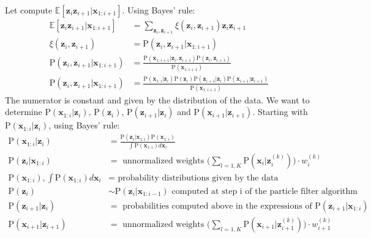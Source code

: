 \documentclass[12pt]{article}
\newcommand{\p}[1]{\mathrm{P}\left(#1 \right)}
\newcommand{\vect}[1]{\mathbf{#1}}
\begin{document}
Let compute $\mathbb{E}[\vect{z}_i \vect{z}_{i+1} | \vect{x}_{1:i+1} ]$.
Using Bayes' rule:
\begin{align*}
	\mathbb{E}[\vect{z}_i \vect{z}_{i+1} | \vect{x}_{1:i+1} ]	&=	\sum_{\vect{z}_i, \vect{z}_{i+1}} \xi(\vect{z}_i, \vect{z}_{i+1}) \vect{z}_i \vect{z}_{i+1} \\
	 \xi(\vect{z}_i, \vect{z}_{i+1})						&=	\p{\vect{z}_i, \vect{z}_{i+1} | \vect{x}_{1:i+1}} \\
	 \p{\vect{z}_i, \vect{z}_{i+1} | \vect{x}_{1:i+1}}			&= 	\frac{ \p{\vect{x}_{1:i+1} | \vect{z}_i,\vect{z}_{i+1}}  \p{\vect{z}_i, \vect{z}_{i+1}} } {\p{\vect{x}_{1:i+1}}} \\
	 \p{\vect{z}_i, \vect{z}_{i+1} | \vect{x}_{1:i+1}}			&= \frac{\p{\vect{x}_{1:i} | \vect{z}_i} \p{\vect{z}_i}  \p{\vect{z}_{i+1} | \vect{z}_i}  \p{\vect{x}_{i+1} | \vect{z}_{i+1} } } {\p{\vect{x}_{1:i+1}}}
\end{align*}
The numerator is constant and given by the distribution of the data. We want to determine $\p{\vect{x}_{1:i} | \vect{z}_i}$, $\p{\vect{z}_i}$, $\p{\vect{z}_{i+1} | \vect{z}_i}$ and $ \p{\vect{x}_{i+1} | \vect{z}_{i+1} }$.
Starting with $\p{\vect{x}_{1:i} | \vect{z}_i}$, using Bayes' rule:
\begin{align*}
		\p{\vect{x}_{1:i} | \vect{z}_i}					&=	\frac{ \p{\vect{z}_i | \vect{x}_{1:i}} \p{\vect{x}_{1:i}} }		{\int  \p{\vect{x}_{1:i}} d \vect{x}_i} \\
		\p{\vect{z}_i | \vect{x}_{1:i}}					&= \text{ unnormalized weights } \big( \sum_{l=1,K} \p{\vect{x}_i | \vect{z}_i^{(k)}} \big) \cdot w_i^{(k)} \\
		\p{\vect{x}_{1:i}}, \int  \p{\vect{x}_{1:i}} d \vect{x}_i 	&= \text{ probability distributions given by the data } \\
		\p{\vect{z}_i}								&\sim  \p{\vect{z}_i | \vect{x}_{1:i-1}} \text{ computed at step i of the particle filter algorithm }\\
		 \p{\vect{z}_{i+1} | \vect{z}_i}  					&= \text{ probabilities computed above in the expressions of } \p{ \vect{z}_{i+1} | \vect{x}_{1:i} } \\
		 \p{\vect{x}_{i+1} | \vect{z}_{i+1}} 				&= \text{ unnormalized weights } \big( \sum_{l=1,K} \p{\vect{x}_{i+1} | \vect{z}_{i+1}^{(k)}} \big) \cdot w_{i+1}^{(k)} 
\end{align*}
\end{document}
